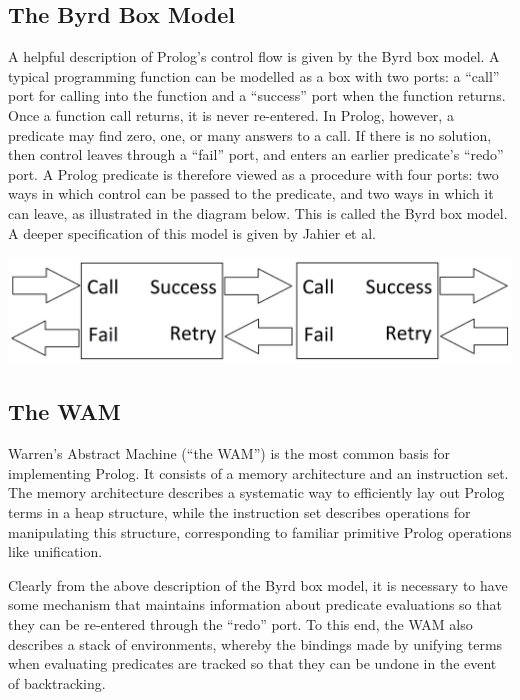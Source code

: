 \documentclass[12pt]{article}
\begin{document}
\subsection{The Byrd Box Model}

A helpful description of Prolog's control flow is given by the Byrd box model. 
A typical programming function can be modelled as a box with two ports: a ``call'' port for calling into the function and a ``success'' port when the function returns. 
Once a function call returns, it is never re-entered.
In Prolog, however, a predicate may find zero, one, or many answers to a call. 
If there is no solution, then control leaves through a ``fail'' port, and enters an earlier predicate's ``redo'' port.
A Prolog predicate is therefore viewed as a procedure with four ports: two ways in which control can be passed to the predicate, and two ways in which it can leave, as illustrated in the diagram below.
This is called the Byrd box model.
A deeper specification of this model is given by Jahier et al. \cite{byrd00}

\vspace{30px}

\includegraphics[scale=0.195]{Byrd.png}

\vspace{20px}

\subsection{The WAM}

Warren's Abstract Machine (``the WAM'') is the most common basis for implementing Prolog. 
It consists of a memory architecture and an instruction set. 
The memory architecture describes a systematic way to efficiently lay out Prolog terms in a heap structure, while the instruction set describes operations for manipulating this structure, corresponding to familiar primitive Prolog operations like unification. 

Clearly from the above description of the Byrd box model, it is necessary to have some mechanism that maintains information about predicate evaluations so that they can be re-entered through the ``redo'' port. 
To this end, the WAM also describes a stack of environments, whereby the bindings made by unifying terms when evaluating predicates are tracked so that they can be undone in the event of backtracking. 
\end{document}
